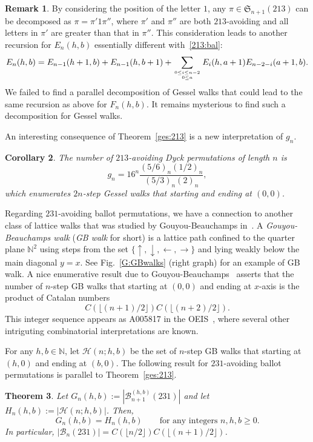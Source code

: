 \documentclass[12pt]{amsart}
\numberwithin{equation}{section}
\theoremstyle{plain}
\newtheorem{theorem}{Theorem}[section]
\newtheorem{corollary}[theorem]{Corollary}
\theoremstyle{definition}
\newtheorem{remark}[theorem]{Remark}
\newcommand{\N}{\mathbb{N}}
\newcommand{\B}{\mathcal{B}}
\newcommand{\Hw}{\mathcal{H}}
\def\S{\mathfrak{S}}
\begin{document}
\begin{remark}
By considering the position of the letter $1$, any $\pi\in\S_{n+1}(213)$ can be decomposed as $\pi=\pi'1\pi''$, where $\pi'$ and $\pi''$ are both $213$-avoiding and all letters in $\pi'$ are greater than that in $\pi''$. This consideration leads to another recursion for $E_n(h,b)$ essentially different with~\eqref{213:bal}:  
\begin{equation}
E_n(h,b)=E_{n-1}(h+1,b)+E_{n-1}(h,b+1)+\sum_{0\leq i\leq n-2\atop{0\leq a}}E_i(h,a+1)E_{n-2-i}(a+1,b).
\end{equation}
We failed to find a parallel decomposition of Gessel walks that could lead to the same recursion as above for $F_n(h,b)$. It remains mysterious to find such a decomposition for Gessel walks. 
\end{remark}

An interesting consequence of Theorem~\ref{ges:213} is a new interpretation of $g_n$. 

\begin{corollary}
The number of $213$-avoiding Dyck permutations of length $n$ is 
$$
g_n=16^n\frac{(5/6)_n(1/2)_n}{(5/3)_n(2)_n},
$$
which enumerates $2n$-step Gessel walks that starting and ending at $(0, 0)$.
\end{corollary}

Regarding $231$-avoiding ballot permutations, we have a connection to another class of lattice walks  that was studied by Gouyou-Beauchamps in~\cite{GB}. A {\em Gouyou-Beauchamps walk} ({\em GB walk} for short) is a lattice path  confined to the quarter plane $\N^2$ using steps from the set $\{\uparrow,\downarrow,\leftarrow,\rightarrow\}$ and lying weakly below the main diagonal $y=x$. See Fig.~\ref{G:GBwalks} (right graph) for an example of GB walk. A  nice enumerative result due to Gouyou-Beauchamps~\cite{GB} asserts that the number of $n$-step GB walks that starting  at $(0, 0)$ and ending at $x$-axis is the product of Catalan numbers 
$$
C(\lfloor (n+1)/2\rfloor)C(\lfloor(n+2)/2\rfloor).
$$
This integer sequence appears as A005817 in the OEIS~\cite{oeis}, where several other intriguting combinatorial interpretations are known. 

For any $h,b\in\N$, let $\Hw(n;h,b)$ be the set of  $n$-step GB walks that starting at $(h,0)$ and ending at $(b,0)$. The following result for $231$-avoiding ballot permutations is parallel to Theorem~\ref{ges:213}.

\begin{theorem}\label{gb:231}
Let $G_n(h,b):=|\B_{n+1}^{(h,b)}(231)|$ and let $H_n(h,b):=|\Hw(n;h,b)|$. Then,
\begin{equation}\label{iden:231}
G_n(h,b)=H_n(h,b)\qquad\text{for any integers $n,h,b\geq0$}. 
\end{equation}
In particular, $|\B_{n}(231)|=C(\lfloor n/2\rfloor)C(\lfloor(n+1)/2\rfloor)$.
\end{theorem}
\end{document}
